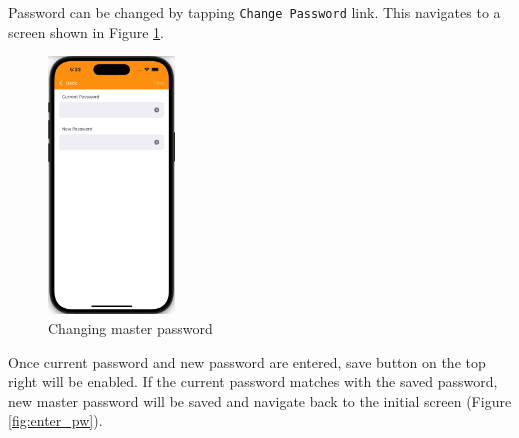 \documentclass[10pt, titlepage]{article}
\begin{document}
Password can be changed by tapping \texttt{Change Password} link. This navigates to a screen shown in Figure \ref{fig:change_pw}.
\begin{figure}[H]
	\centering
	\vspace{-0.25em}
	\includegraphics[width=0.3\textwidth]{img/change_pw}
	\vspace{-0.75em}
	\caption{Changing master password}
	\label{fig:change_pw}
	\vspace{-0.75em}
\end{figure}
Once current password and new password are entered, save button on the top right will be enabled. If the current password matches with the saved password, new master password will be saved and navigate back to the initial screen (Figure \ref{fig:enter_pw}).
\end{document}
